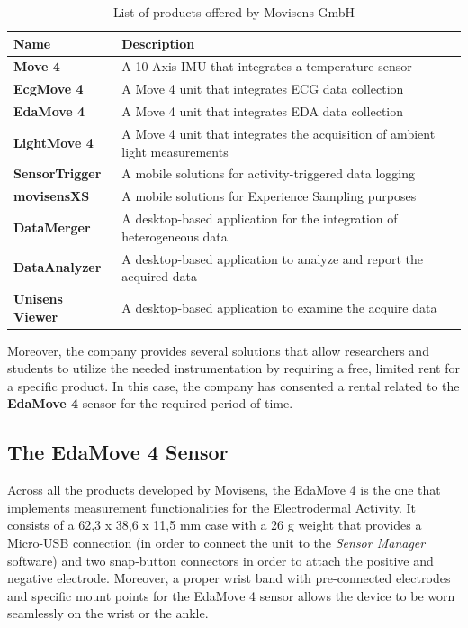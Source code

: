 \begin{table}[H]
\centering
\begin{tabular}{ll}
    \hline
    Name                     &  Description \\
    \hline
    \textbf{Move 4}          & A 10-Axis IMU that integrates a temperature sensor \\
    \textbf{EcgMove 4}       & A Move 4 unit that integrates ECG data collection  \\
    \textbf{EdaMove 4}       & A Move 4 unit that integrates EDA data collection \\
    \textbf{LightMove 4}     & A Move 4 unit that integrates the acquisition of ambient light measurements \\
    \textbf{SensorTrigger}   & A mobile solutions for activity-triggered data logging \\
    \textbf{movisensXS}      & A mobile solutions for Experience Sampling purposes \\
    \textbf{DataMerger}      & A desktop-based application for the integration of heterogeneous data \\
    \textbf{DataAnalyzer}    & A desktop-based application to analyze and report the acquired data \\
    \textbf{Unisens Viewer}  & A desktop-based application to examine the acquire data \\
    \hline
\end{tabular}
\caption{List of products offered by Movisens GmbH}
\label{toc:movisens-products}
\end{table}

Moreover, the company provides several solutions that allow researchers and students to utilize the needed instrumentation by requiring a free, limited rent for a specific product. In this case, the company has consented a rental related to the \textbf{EdaMove 4} sensor for the required period of time. 

\subsection{The EdaMove 4 Sensor}\label{subsec:edamove4}

Across all the products developed by Movisens, the EdaMove 4 is the one that implements measurement functionalities for the Electrodermal Activity. It consists of a 62,3 x 38,6 x 11,5 mm case with a 26 g weight \cite{edamove4} that provides a Micro-USB connection (in order to connect the unit to the \textit{Sensor Manager} software) and two snap-button connectors in order to attach the positive and negative electrode. Moreover, a proper wrist band with pre-connected electrodes and specific mount points for the EdaMove 4 sensor allows the device to be worn seamlessly on the wrist or the ankle.


